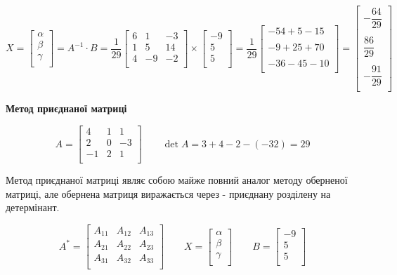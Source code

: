 $$
X = \begin{bmatrix}
  \alpha \\
  \beta  \\
  \gamma \\
\end{bmatrix} =
A^{-1} \cdot B =
\dfrac{1}{29} \begin{bmatrix}
  6 & 1 & -3 \\
  1 & 5 & 14 \\
  4 & -9 & -2 \\
\end{bmatrix} \times \begin{bmatrix}
  -9 \\
  5  \\
  5 \\
\end{bmatrix} = \dfrac{1}{29} \begin{bmatrix}
-54+5-15\\
\\
-9+25+70\\
\\
-36-45-10\\
\end{bmatrix} = \begin{bmatrix}
-\dfrac{64}{29} \\
\\
\dfrac{86}{29} \\
\\
- \dfrac{91}{29} \\
\end{bmatrix}
$$


\begin{center}\textbf{ Метод приєднаної матриці } \end{center}

  $$
    A = \begin{bmatrix}
      4 & 1 &  1 \\
      2 & 0 & -3 \\
     -1 & 2 &  1 \\
    \end{bmatrix} \qquad \det{A} = 3 + 4 - 2 - (- 32) = 29
  $$

Метод приєднаної матриці являє собою майже повний аналог методу оберненої матриці, але обернена матриця виражається через - приєднану розділену на детермінант.

$$
A^* =
\begin{bmatrix}
  A_{11} & A_{12} & A_{13} \\
  A_{21} & A_{22} & A_{23} \\
  A_{31} & A_{32} & A_{33} \\
\end{bmatrix}
\qquad
X = \begin{bmatrix}
  \alpha \\
  \beta  \\
  \gamma \\
\end{bmatrix}
\qquad
B = \begin{bmatrix}
  -9 \\
  5  \\
  5 \\
\end{bmatrix}
$$

